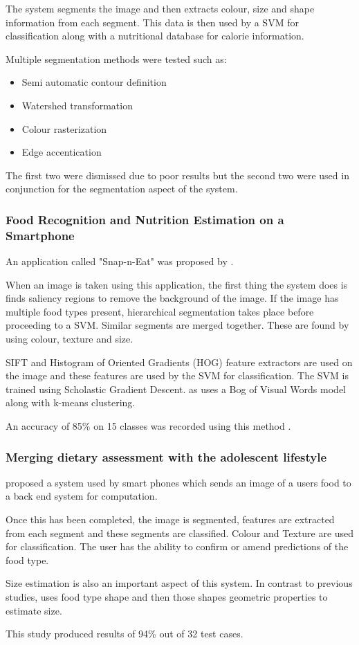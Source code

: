 The system segments the image and then extracts colour, size and shape information from each segment. This data is then used by a SVM for classification along with a nutritional database for calorie information. 

Multiple segmentation methods were tested such as:
\begin{itemize}
	\item{Semi automatic contour definition}
	\item{Watershed transformation}
	\item{Colour rasterization}
	\item{Edge accentication}
\end{itemize}
The first two were dismissed due to poor results but the second two were used in conjunction for the segmentation aspect of the system.

\subsubsection*{Food Recognition and Nutrition Estimation on a Smartphone}
An application called "Snap-n-Eat" was proposed by \textcite{snap}.

When an image is taken using this application, the first thing the system does is finds saliency regions to remove the background of the image.
If the image has multiple food types present, hierarchical segmentation takes place before proceeding to a SVM. Similar segments are merged together.
These are found by using colour, texture and size.

SIFT and Histogram of Oriented Gradients (HOG) feature extractors are used on the image and these features are used by the SVM for classification.
The SVM is trained using Scholastic Gradient Descent.
\textcite{snap} as uses a Bog of Visual Words model along with k-means clustering.

An accuracy of 85\% on 15 classes was recorded using this method \textcite{snap}.

\subsubsection*{Merging dietary assessment with the adolescent lifestyle}
\textcite{schap2014merging} proposed a system used by smart phones which sends an image of a users food to a back end system for computation.

Once this has been completed, the image is segmented, features are extracted from each segment and these segments are classified.
Colour and Texture are used for classification.
The user has the ability to confirm or amend predictions of the food type.

Size estimation is also an important aspect of this system.
In contrast to previous studies, \textcite{snap} uses food type shape and then those shapes geometric properties to estimate size.

This study produced results of 94\% out of 32 test cases.